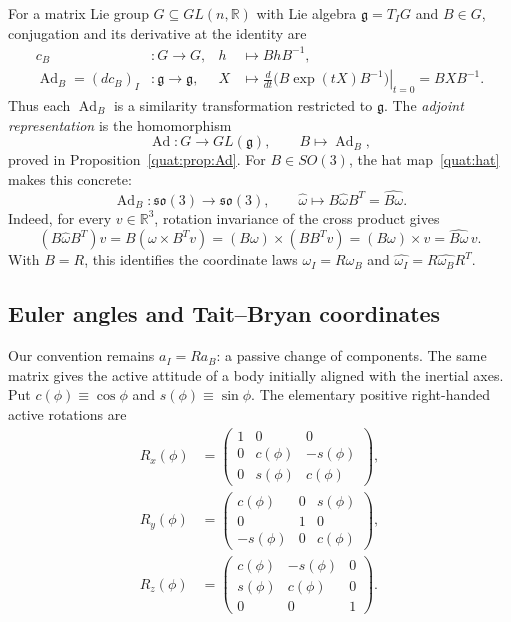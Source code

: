 For a matrix Lie group $G\subseteq GL(n,\mathbb R)$ with Lie algebra
$\mathfrak g=T_I G$ and $B\in G$, conjugation and its derivative at the identity are
\begin{equation}\label{gnc:conjugation-adjoint}
 \begin{aligned}
 c_B&\colon G\longrightarrow G,
       &h&\longmapsto BhB^{-1},\\
 \operatorname{Ad}_B=(dc_B)_I&\colon\mathfrak g\longrightarrow\mathfrak g,
       &X&\longmapsto
       \left.\frac{d}{dt}\bigl(B\exp(tX)B^{-1}\bigr)\right|_{t=0}
       =BXB^{-1}.
 \end{aligned}
\end{equation}
Thus each $\operatorname{Ad}_B$ is a similarity transformation restricted
to $\mathfrak g$. The \emph{adjoint representation} is the homomorphism
\[
 \operatorname{Ad}\colon G\longrightarrow GL(\mathfrak g),\qquad
 B\longmapsto\operatorname{Ad}_B,
\]
proved in Proposition~\ref{quat:prop:Ad}.
For $B\in SO(3)$, the hat map~\eqref{quat:hat} makes this concrete:
\begin{equation}\label{gnc:so3-adjoint-hat}
 \operatorname{Ad}_B\colon\mathfrak{so}(3)\longrightarrow\mathfrak{so}(3),
 \qquad\widehat{\omega}\longmapsto
 B\widehat{\omega}B^T=\widehat{B\omega}.
\end{equation}
Indeed, for every $v\in\mathbb R^3$, rotation invariance of the cross
product gives
\[
 (B\widehat{\omega}B^T)v
 =B(\omega\times B^Tv)
 =(B\omega)\times(BB^Tv)
 =(B\omega)\times v=\widehat{B\omega}\,v.
\]
With $B=R$, this identifies the coordinate laws
$\omega_I=R\omega_B$ and
$\widehat{\omega_I}=R\widehat{\omega_B}R^T$.

\subsection{Euler angles and Tait--Bryan coordinates}
Our convention remains $a_I=Ra_B$: a passive change of components.
The same matrix gives the active attitude of a body initially aligned
with the inertial axes. Put $c(\phi)\equiv\cos\phi$ and
$s(\phi)\equiv\sin\phi$. The elementary positive right-handed active
rotations are
\begin{equation}\label{gnc:elementary-rotations}
 \begin{aligned}
 R_x(\phi)&=\begin{pmatrix}1&0&0\\0&c(\phi)&-s(\phi)\\0&s(\phi)&c(\phi)\end{pmatrix},\\
 R_y(\phi)&=\begin{pmatrix}c(\phi)&0&s(\phi)\\0&1&0\\-s(\phi)&0&c(\phi)\end{pmatrix},\\
 R_z(\phi)&=\begin{pmatrix}c(\phi)&-s(\phi)&0\\s(\phi)&c(\phi)&0\\0&0&1\end{pmatrix}.
 \end{aligned}
\end{equation}

